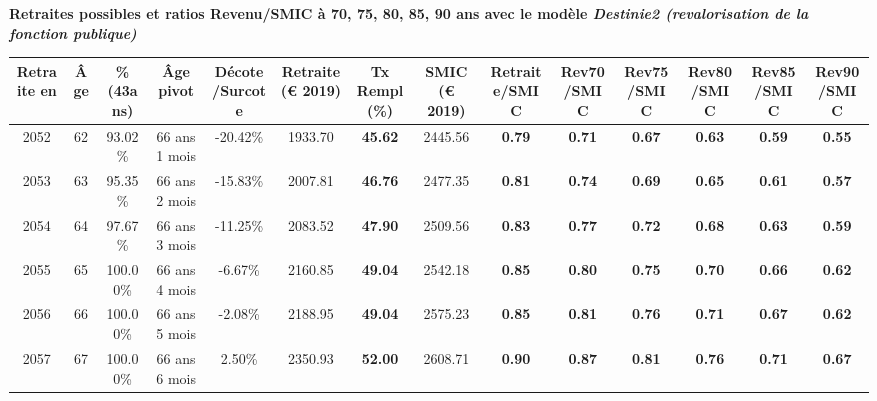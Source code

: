  \vspace{0.1cm} 
{\bf \noindent Retraites possibles et ratios Revenu/SMIC à 70, 75, 80, 85, 90 ans avec le modèle \emph{Destinie2 (revalorisation de la fonction publique)}}  
 
\begin{adjustbox}{max width=\textwidth} 
\begin{tabular}[htb]{|c|c||c|c|c||c|c||c||c|c|c|c|c|c|} 
\hline 
 Retraite en &  Âge &  \%(43ans) &  Âge pivot &  Décote/Surcote &  Retraite (\euro{} 2019) &  Tx Rempl(\%) &  SMIC (\euro{} 2019) &  Retraite/SMIC &  Rev70/SMIC &  Rev75/SMIC &  Rev80/SMIC &  Rev85/SMIC &  Rev90/SMIC \\ 
\hline \hline 
 2052 &  62 &  93.02\% &  66 ans 1 mois &  -20.42\% &  1933.70 &  {\bf 45.62} &  2445.56 &  {\bf {\color{red} 0.79}} &  {\bf {\color{red} 0.71}} &  {\bf {\color{red} 0.67}} &  {\bf {\color{red} 0.63}} &  {\bf {\color{red} 0.59}} &  {\bf {\color{red} 0.55}} \\ 
\hline 
 2053 &  63 &  95.35\% &  66 ans 2 mois &  -15.83\% &  2007.81 &  {\bf 46.76} &  2477.35 &  {\bf {\color{red} 0.81}} &  {\bf {\color{red} 0.74}} &  {\bf {\color{red} 0.69}} &  {\bf {\color{red} 0.65}} &  {\bf {\color{red} 0.61}} &  {\bf {\color{red} 0.57}} \\ 
\hline 
 2054 &  64 &  97.67\% &  66 ans 3 mois &  -11.25\% &  2083.52 &  {\bf 47.90} &  2509.56 &  {\bf {\color{red} 0.83}} &  {\bf {\color{red} 0.77}} &  {\bf {\color{red} 0.72}} &  {\bf {\color{red} 0.68}} &  {\bf {\color{red} 0.63}} &  {\bf {\color{red} 0.59}} \\ 
\hline 
 2055 &  65 &  100.00\% &  66 ans 4 mois &  -6.67\% &  2160.85 &  {\bf 49.04} &  2542.18 &  {\bf {\color{red} 0.85}} &  {\bf {\color{red} 0.80}} &  {\bf {\color{red} 0.75}} &  {\bf {\color{red} 0.70}} &  {\bf {\color{red} 0.66}} &  {\bf {\color{red} 0.62}} \\ 
\hline 
 2056 &  66 &  100.00\% &  66 ans 5 mois &  -2.08\% &  2188.95 &  {\bf 49.04} &  2575.23 &  {\bf {\color{red} 0.85}} &  {\bf {\color{red} 0.81}} &  {\bf {\color{red} 0.76}} &  {\bf {\color{red} 0.71}} &  {\bf {\color{red} 0.67}} &  {\bf {\color{red} 0.62}} \\ 
\hline 
 2057 &  67 &  100.00\% &  66 ans 6 mois &  2.50\% &  2350.93 &  {\bf 52.00} &  2608.71 &  {\bf {\color{red} 0.90}} &  {\bf {\color{red} 0.87}} &  {\bf {\color{red} 0.81}} &  {\bf {\color{red} 0.76}} &  {\bf {\color{red} 0.71}} &  {\bf {\color{red} 0.67}} \\ 
\hline 
\hline 
\end{tabular} 
\end{adjustbox} 
 
